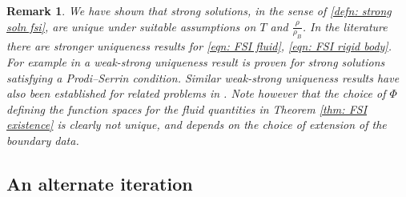 \documentclass[a4paper]{amsart}
\numberwithin{equation}{section}
\theoremstyle{plain}
\newtheorem{remark}[theorem]{Remark}
\begin{document}
\begin{remark}
We have shown that strong solutions, in the sense of \eqref{defn: strong soln fsi}, are unique under suitable assumptions on $T$ and $\frac{\rho}{\rho_B}$.
In the literature there are stronger uniqueness results for \eqref{eqn: FSI fluid}, \eqref{eqn: FSI rigid body}.
For example in \cite{muha2021uniqueness} a weak-strong uniqueness result is proven for strong solutions satisfying a Prodi--Serrin condition.
Similar weak-strong uniqueness results have also been established for related problems in \cite{chemetov2019weak,disser2016inertial,glass2015uniqueness,kreml2020weak,maity2024uniqueness}.
Note however that the choice of $\Phi$ defining the function spaces for the fluid quantities in Theorem \ref{thm: FSI existence} is clearly not unique, and depends on the choice of extension of the boundary data.
\end{remark}

\subsection{An alternate iteration}
\label{subsection: alternate iteration}
\end{document}
